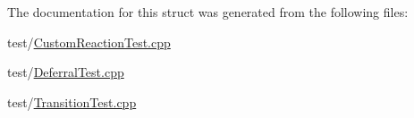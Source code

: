 The documentation for this struct was generated from the following files\+:\begin{DoxyCompactItemize}
\item 
test/\mbox{\hyperlink{_custom_reaction_test_8cpp}{Custom\+Reaction\+Test.\+cpp}}\item 
test/\mbox{\hyperlink{_deferral_test_8cpp}{Deferral\+Test.\+cpp}}\item 
test/\mbox{\hyperlink{_transition_test_8cpp}{Transition\+Test.\+cpp}}\end{DoxyCompactItemize}
